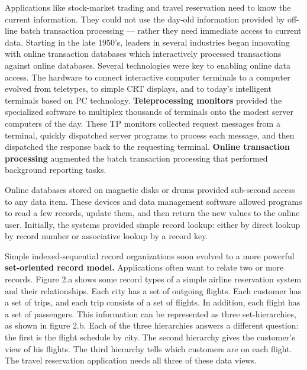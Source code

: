 \documentclass[a4paper,12pt,notitlepage,twoside,openright]{article}
\begin{document}
Applications like stock-market trading and travel reservation need to
know the current information. They could not use the day-old information
provided by off-line batch transaction processing --- rather they need
immediate access to current data. Starting in the late 1950's, leaders
in several industries began innovating with online transaction databases
which interactively processed transactions against online databases.
Several technologies were key to enabling online data access. The
hardware to connect interactive computer terminals to a computer evolved
from teletypes, to simple CRT displays, and to today's intelligent
terminals based on PC technology. \textbf{Teleprocessing monitors}
provided the specialized software to multiplex thousands of terminals
onto the modest server computers of the day. These TP monitors collected
request messages from a terminal, quickly dispatched server programs to
process each message, and then dispatched the response back to the
requesting terminal. \textbf{Online transaction processing} augmented
the batch transaction processing that performed background reporting
tasks.

Online databases stored on magnetic disks or drums provided sub-second
access to any data item. These devices and data management software
allowed programs to read a few records, update them, and then return the
new values to the online user. Initially, the systems provided simple
record lookup: either by direct lookup by record number or associative
lookup by a record key.

Simple indexed-sequential record organizations soon evolved to a more
powerful \textbf{set-oriented record model.} Applications often want to
relate two or more records. Figure 2.a shows some record types of a
simple airline reservation system and their relationships. Each city has
a set of outgoing flights. Each customer has a set of trips, and each
trip consists of a set of flights. In addition, each flight has a set of
passengers. This information can be represented as three
set-hierarchies, as shown in figure 2.b. Each of the three hierarchies
answers a different question: the first is the flight schedule by city.
The second hierarchy gives the customer's view of his flights. The third
hierarchy tells which customers are on each flight. The travel
reservation application needs all three of these data views.
\end{document}
